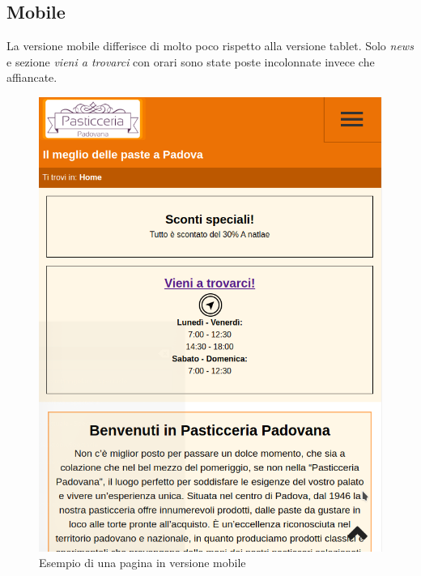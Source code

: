 \subsection{Mobile}
La versione mobile differisce di molto poco rispetto alla versione tablet. Solo \emph{news} e sezione \emph{vieni a trovarci} con orari sono state poste incolonnate invece che affiancate.
\begin{figure}[!h]
    \centering		  
	\includegraphics[width=0.8\linewidth]{sezioni/Progettazione/Immagini/mobile_example.png}
	\caption{Esempio di una pagina in versione mobile}
	\label{Fig:verMobile}
\end{figure}
\newpage

